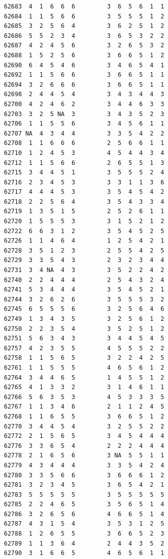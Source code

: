 \documentclass[
  letterpaper,
  DIV=11,
  numbers=noendperiod]{scrreprt}
\begin{document}
\begin{verbatim}
62683  4  1  6  6  6         3  6  5  6  1  1
62684  1  1  5  6  6         3  5  5  5  1  2
62685  3  2  5  6  4         3  6  2  5  1  2
62686  5  5  2  3  4         3  6  5  3  2  2
62687  4  2  4  5  6         3  2  6  5  3  2
62688  1  5  2  5  6         3  6  6  5  1  2
62690  6  4  5  4  6         3  4  6  5  4  1
62692  1  1  5  6  6         3  6  6  5  1  1
62694  3  2  6  6  6         3  6  6  5  1  1
62698  2  4  4  5  4         3  4  3  4  4  3
62700  4  2  4  6  2         3  4  4  6  3  3
62703  3  2  5 NA  3         3  4  3  5  2  3
62706  1  1  5  5  6         3  4  5  6  1  1
62707 NA  4  3  4  4         3  3  5  4  2  2
62708  1  1  6  6  6         2  5  6  6  1  1
62710  1  2  4  5  3         4  5  4  4  3  4
62712  1  1  5  6  6         2  6  5  5  1  3
62715  3  4  4  5  1         3  5  5  5  2  4
62716  2  3  4  5  3         3  3  1  1  3  6
62717  4  4  4  5  3         3  5  4  5  4  2
62718  2  2  5  6  4         3  5  4  3  3  4
62719  1  3  5  1  5         2  5  2  6  1  1
62720  1  5  5  5  3         3  1  5  2  1  2
62722  6  6  3  1  2         3  5  4  5  2  5
62726  1  1  4  6  4         1  2  5  4  2  1
62728  3  5  1  2  3         2  5  5  4  2  5
62729  3  3  5  4  3         2  3  2  3  4  4
62731  3  4 NA  4  3         3  5  2  2  4  2
62740  2  2  4  4  4         2  5  4  3  2  4
62741  5  3  4  4  4         3  5  4  5  2  1
62744  3  2  6  2  6         3  5  5  5  3  2
62745  6  5  5  5  6         3  2  5  6  4  6
62749  1  3  4  3  5         3  2  5  6  1  2
62750  2  2  3  5  4         3  5  2  5  1  2
62751  5  6  3  4  3         3  4  4  5  4  5
62757  4  2  3  5  5         4  5  5  5  2  2
62758  1  1  5  6  5         3  2  2  4  2  5
62761  1  1  5  5  5         4  6  5  6  1  2
62764  3  4  4  6  5         1  4  5  5  1  2
62765  4  1  3  3  2         3  1  4  6  1  1
62766  5  6  3  5  3         4  5  3  3  3  5
62767  1  1  3  4  6         2  1  1  2  4  5
62768  1  1  6  5  5         3  6  6  5  1  2
62770  3  4  4  5  4         3  2  5  5  2  2
62772  2  1  5  6  5         3  4  5  4  4  4
62776  3  3  6  5  4         2  2  2  4  4  4
62778  2  1  6  5  6         3 NA  5  5  1  1
62779  4  3  4  4  4         3  3  5  4  2  4
62780  3  3  5  6  6         3  6  6  6  1  2
62781  3  2  3  4  5         3  6  5  4  2  1
62783  5  5  5  5  5         3  5  5  5  5  5
62785  2  2  4  6  5         3  5  6  5  1  4
62786  3  2  6  5  6         4  6  6  5  1  4
62787  4  3  1  5  4         3  5  3  1  2  5
62788  1  2  6  5  5         3  6  6  5  2  3
62789  1  1  3  6  4         2  4  4  3  5  2
62790  3  1  6  6  5         4  6  5  6  1  1

\end{verbatim}
\end{document}
